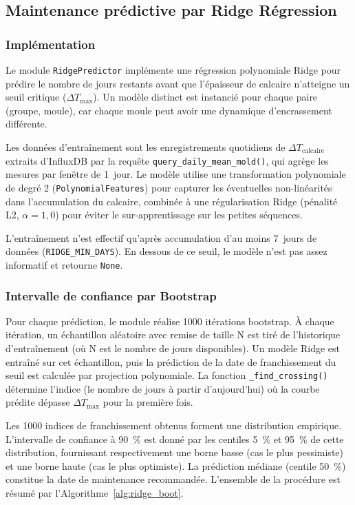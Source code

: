 \subsection{Maintenance prédictive par Ridge Régression}

\subsubsection{Implémentation}

Le module \texttt{RidgePredictor} implémente une régression polynomiale Ridge pour prédire le nombre de jours restants avant que l'épaisseur de calcaire n'atteigne un seuil critique (\(\Delta T_{\text{max}}\)). Un modèle distinct est instancié pour chaque paire (groupe, moule), car chaque moule peut avoir une dynamique d'encrassement différente.

Les données d'entraînement sont les enregistrements quotidiens de \(\Delta T_{\text{calcaire}}\) extraits d'InfluxDB par la requête \texttt{query\_daily\_mean\_mold()}, qui agrège les mesures par fenêtre de 1~jour. Le modèle utilise une transformation polynomiale de degré 2 (\texttt{PolynomialFeatures}) pour capturer les éventuelles non-linéarités dans l'accumulation du calcaire, combinée à une régularisation Ridge (pénalité L2, \(\alpha = 1,0\)) pour éviter le sur-apprentissage sur les petites séquences.

L'entraînement n'est effectif qu'après accumulation d'au moins 7~jours de données (\texttt{RIDGE\_MIN\_DAYS}). En dessous de ce seuil, le modèle n'est pas assez informatif et retourne \texttt{None}.

\subsubsection{Intervalle de confiance par Bootstrap}

Pour chaque prédiction, le module réalise 1000 itérations bootstrap. À chaque itération, un échantillon aléatoire avec remise de taille N est tiré de l'historique d'entraînement (où N est le nombre de jours disponibles). Un modèle Ridge est entraîné sur cet échantillon, puis la prédiction de la date de franchissement du seuil est calculée par projection polynomiale. La fonction \texttt{\_find\_crossing()} détermine l'indice (le nombre de jours à partir d'aujourd'hui) où la courbe prédite dépasse \(\Delta T_{\text{max}}\) pour la première fois.

Les 1000 indices de franchissement obtenus forment une distribution empirique. L'intervalle de confiance à 90~\% est donné par les centiles 5~\% et 95~\% de cette distribution, fournissant respectivement une borne basse (cas le plus pessimiste) et une borne haute (cas le plus optimiste). La prédiction médiane (centile 50~\%) constitue la date de maintenance recommandée. L'ensemble de la procédure est résumé par l'Algorithme~\ref{alg:ridge_boot}.

